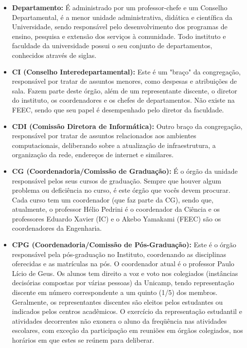 \begin{itemize}
\item  \textbf{Departamento:} É administrado por um professor-chefe e um Conselho Departamental, é a menor unidade administrativa, didática e científica da Universidade, sendo responsável pelo desenvolvimento dos programas de ensino, pesquisa e extensão dos serviços à comunidade. Todo instituto e faculdade da universidade possui o seu conjunto de departamentos, conhecidos através de siglas.
\end{itemize}

\begin{itemize}
\item  \textbf{CI (Conselho Interedepartamental):} Este é um "braço" da congregação, responsável por tratar de assuntos menores, como despesas e atribuições de sala. Fazem parte deste órgão, além de um representante discente, o diretor do instituto, os coordenadores e os chefes de departamentos. Não existe na FEEC, sendo que seu papel é desempenhado pelo diretor da faculdade.
\end{itemize}

\begin{itemize}
\item  \textbf{CDI (Comissão Diretora de Informática):} Outro braço da congregação, responsável por tratar de assuntos relacionados aos ambientes computacionais, deliberando sobre a atualização de infraestrutura, a organização da rede, endereços de internet e similares.
\end{itemize}

\begin{itemize}
\item  \textbf{CG (Coordenadoria/Comissão de Graduação):} É o órgão da unidade responsável pelos seus cursos de graduação. Sempre que houver algum problema ou deficiência no curso, é este órgão que vocês devem procurar. Cada curso tem um coordenador (que faz parte da CG), sendo que, atualmente, o professor Hélio Pedrini é o coordenador da Ciência e os professores Eduardo Xavier (IC) e o Akebo Yamakami (FEEC) são os coordenadores da Engenharia.
\end{itemize}

\begin{itemize}
\item  \textbf{CPG (Coordenadoria/Comissão de Pós-Graduação):} Este é o órgão responsável pela pós-graduação no Instituto, coordenando as disciplinas oferecidas e as matrículas na pós. O coordenador atual é o professor Paulo Lício de Geus. Os alunos tem direito a voz e voto nos colegiados (instâncias decisórias compostas por várias pessoas) da Unicamp, tendo representação discente em número correspondente a um quinto (1/5) dos membros. Geralmente, os representantes discentes são eleitos pelos estudantes ou indicados pelos centros acadêmicos. O exercício da representação estudantil e atividades decorrentes não exonera o aluno da freqüência nas atividades escolares, com exceção da participação em reuniões em órgãos colegiados, nos horários em que estes se reúnem para deliberar.
\end{itemize}

